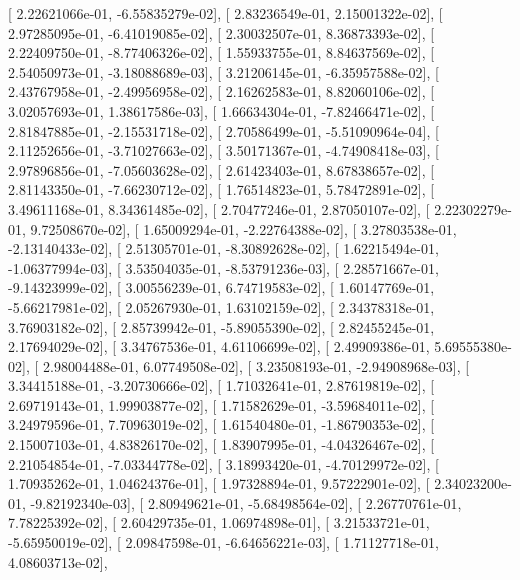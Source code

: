 \documentclass{article}
\begin{document}
       [  2.22621066e-01,  -6.55835279e-02],
       [  2.83236549e-01,   2.15001322e-02],
       [  2.97285095e-01,  -6.41019085e-02],
       [  2.30032507e-01,   8.36873393e-02],
       [  2.22409750e-01,  -8.77406326e-02],
       [  1.55933755e-01,   8.84637569e-02],
       [  2.54050973e-01,  -3.18088689e-03],
       [  3.21206145e-01,  -6.35957588e-02],
       [  2.43767958e-01,  -2.49956958e-02],
       [  2.16262583e-01,   8.82060106e-02],
       [  3.02057693e-01,   1.38617586e-03],
       [  1.66634304e-01,  -7.82466471e-02],
       [  2.81847885e-01,  -2.15531718e-02],
       [  2.70586499e-01,  -5.51090964e-04],
       [  2.11252656e-01,  -3.71027663e-02],
       [  3.50171367e-01,  -4.74908418e-03],
       [  2.97896856e-01,  -7.05603628e-02],
       [  2.61423403e-01,   8.67838657e-02],
       [  2.81143350e-01,  -7.66230712e-02],
       [  1.76514823e-01,   5.78472891e-02],
       [  3.49611168e-01,   8.34361485e-02],
       [  2.70477246e-01,   2.87050107e-02],
       [  2.22302279e-01,   9.72508670e-02],
       [  1.65009294e-01,  -2.22764388e-02],
       [  3.27803538e-01,  -2.13140433e-02],
       [  2.51305701e-01,  -8.30892628e-02],
       [  1.62215494e-01,  -1.06377994e-03],
       [  3.53504035e-01,  -8.53791236e-03],
       [  2.28571667e-01,  -9.14323999e-02],
       [  3.00556239e-01,   6.74719583e-02],
       [  1.60147769e-01,  -5.66217981e-02],
       [  2.05267930e-01,   1.63102159e-02],
       [  2.34378318e-01,   3.76903182e-02],
       [  2.85739942e-01,  -5.89055390e-02],
       [  2.82455245e-01,   2.17694029e-02],
       [  3.34767536e-01,   4.61106699e-02],
       [  2.49909386e-01,   5.69555380e-02],
       [  2.98004488e-01,   6.07749508e-02],
       [  3.23508193e-01,  -2.94908968e-03],
       [  3.34415188e-01,  -3.20730666e-02],
       [  1.71032641e-01,   2.87619819e-02],
       [  2.69719143e-01,   1.99903877e-02],
       [  1.71582629e-01,  -3.59684011e-02],
       [  3.24979596e-01,   7.70963019e-02],
       [  1.61540480e-01,  -1.86790353e-02],
       [  2.15007103e-01,   4.83826170e-02],
       [  1.83907995e-01,  -4.04326467e-02],
       [  2.21054854e-01,  -7.03344778e-02],
       [  3.18993420e-01,  -4.70129972e-02],
       [  1.70935262e-01,   1.04624376e-01],
       [  1.97328894e-01,   9.57222901e-02],
       [  2.34023200e-01,  -9.82192340e-03],
       [  2.80949621e-01,  -5.68498564e-02],
       [  2.26770761e-01,   7.78225392e-02],
       [  2.60429735e-01,   1.06974898e-01],
       [  3.21533721e-01,  -5.65950019e-02],
       [  2.09847598e-01,  -6.64656221e-03],
       [  1.71127718e-01,   4.08603713e-02],
\end{document}
